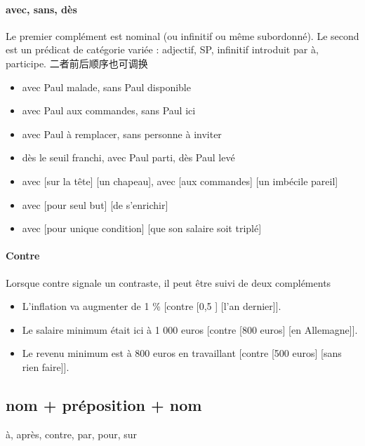 \documentclass[UTF8]{report}
\begin{document}
\paragraph{avec, sans, dès}
Le premier complément est nominal (ou infinitif ou même subordonné). Le second est un prédicat de catégorie variée : adjectif, SP, infinitif introduit par à, participe. 二者前后顺序也可调换

\begin{itemize}
    \item avec Paul malade, sans Paul disponible
    \item avec Paul aux commandes, sans Paul ici
    \item avec Paul à remplacer, sans personne à inviter
    \item dès le seuil franchi, avec Paul parti, dès Paul levé
    \item avec [sur la tête] [un chapeau], avec [aux commandes] [un imbécile pareil]
    \item avec [pour seul but] [de s’enrichir]
    \item avec [pour unique condition] [que son salaire soit triplé]
\end{itemize}

\paragraph{Contre}
Lorsque contre signale un contraste, il peut être suivi de deux compléments

\begin{itemize}
    \item L’inflation va augmenter de 1 \% [contre [0,5 ] [l’an dernier]].
    \item Le salaire minimum était ici à 1 000 euros [contre [800 euros] [en Allemagne]].
    \item Le revenu minimum est à 800 euros en travaillant [contre [500 euros] [sans rien faire]].
\end{itemize}

\subsection{nom + préposition + nom}
à, après, contre, par, pour, sur
\end{document}
